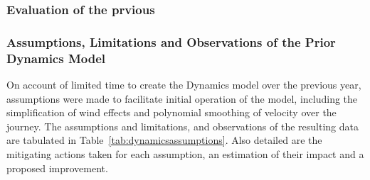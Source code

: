 \documentclass[a4paper, 10pt]{article}
\numberwithin{equation}{section}
\begin{document}
\subsubsection{Evaluation of the prvious}

\subsubsection{Assumptions, Limitations and Observations of the Prior Dynamics Model}

On account of limited time to create the Dynamics model over the previous year, assumptions were made to facilitate initial operation of the model, including the simplification of wind effects and polynomial smoothing of velocity over the journey. The assumptions and limitations, and observations of the resulting data are tabulated in Table~\ref{tab:dynamicsassumptions}. Also detailed are the mitigating actions taken for each assumption, an estimation of their impact and a proposed improvement.
\end{document}
